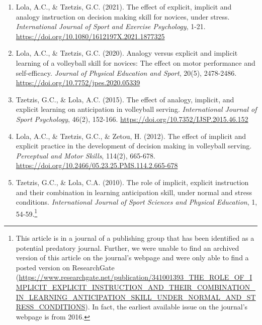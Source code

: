 \documentclass[
  english,
  man, donotrepeattitle,floatsintext]{apa7}
\begin{document}
\begin{enumerate}
\def\labelenumi{\arabic{enumi}.}
\item
  Lola, A.C., \& Tzetzis, G.C. (2021). The effect of explicit, implicit and analogy instruction on decision making skill for novices, under stress. \emph{International Journal of Sport and Exercise Psychology}, 1-21. \url{https://doi.org/10.1080/1612197X.2021.1877325}
\item
  Lola, A.C., \& Tzetzis, G.C. (2020). Analogy versus explicit and implicit learning of a volleyball skill for novices: The effect on motor performance and self-efficacy. \emph{Journal of Physical Education and Sport}, 20(5), 2478-2486. \url{https://doi.org/10.7752/jpes.2020.05339}
\item
  Tzetzis, G.C., \& Lola, A.C. (2015). The effect of analogy, implicit, and explicit learning on anticipation in volleyball serving. \emph{International Journal of Sport Psychology}, 46(2), 152-166. \url{https://doi.org/10.7352/IJSP.2015.46.152}
\item
  Lola, A.C., \& Tzetzis, G.C., \& Zetou, H. (2012). The effect of implicit and explicit practice in the development of decision making in volleyball serving. \emph{Perceptual and Motor Skills}, 114(2), 665-678. \url{https://doi.org/10.2466/05.23.25.PMS.114.2.665-678}
\item
  Tzetzis, G.C., \& Lola, C.A. (2010). The role of implicit, explicit instruction and their combination in learning anticipation skill, under normal and stress conditions. \emph{International Journal of Sport Sciences and Physical Education}, 1, 54-59.\footnote{This article is in a journal of a publishing group that has been identified as a potential predatory journal. Further, we were unable to find an archived version of this article on the journal's webpage and were only able to find a posted version on ResearchGate (\url{https://www.researchgate.net/publication/341001393_THE_ROLE_OF_IMPLICIT_EXPLICIT_INSTRUCTION_AND_THEIR_COMBINATION_IN_LEARNING_ANTICIPATION_SKILL_UNDER_NORMAL_AND_STRESS_CONDITIONS}). In fact, the earliest available issue on the journal's webpage is from 2016.}
\end{enumerate}
\end{document}
